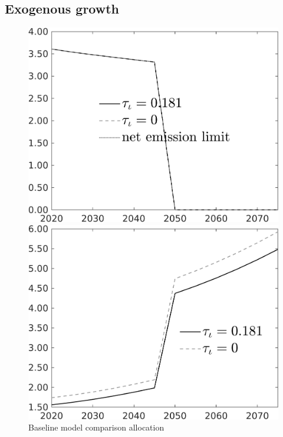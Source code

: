 \documentclass[12pt]{article}
\begin{document}
\subsection{Exogenous growth}
\begin{figure}[h!!]
	\centering
	\caption{Baseline model comparison allocation}\label{fig:Leveltauf_nsk0_xgr1_notaul}
	\begin{minipage}[]{0.32\textwidth}
		\includegraphics[width=1\textwidth]{../../codding_model/own_basedOnFried/optimalPol_010922_revision/figures/all_13Sept22/CompTauf_bytaul_Reg0_Emnet_spillover0_nsk0_xgr1_knspil0_sep1_LFlimit1_emsbase0_countec0_GovRev0_etaa0.79_lgd1.png}
	\end{minipage}		
	\begin{minipage}[]{0.32\textwidth}
		\includegraphics[width=1\textwidth]{../../codding_model/own_basedOnFried/optimalPol_010922_revision/figures/all_13Sept22/CompTauf_bytaul_Reg0_tauf_spillover0_nsk0_xgr1_knspil0_sep1_LFlimit1_emsbase0_countec0_GovRev0_etaa0.79_lgd1.png}

\end{minipage}
\end{figure}
\end{document}
